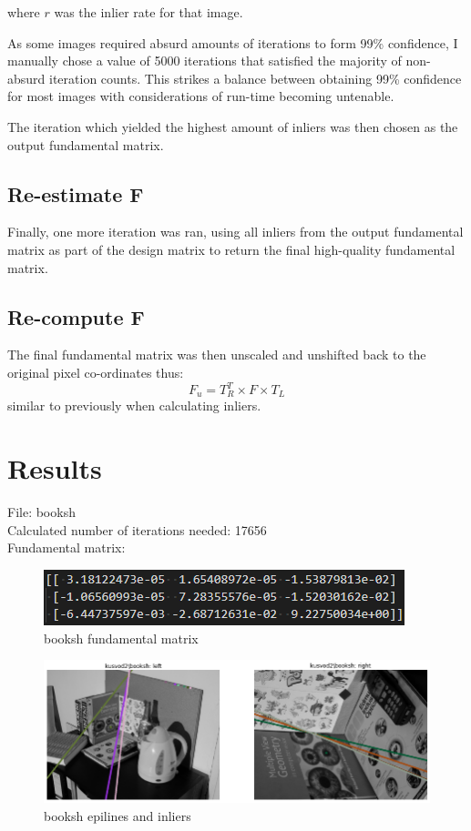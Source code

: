 \documentclass[10pt,a4paper]{article}
\begin{document}
where $r$ was the inlier rate for that image.

As some images required absurd amounts of iterations to form 99\% confidence, I manually chose a value of 5000 iterations that satisfied the majority of non-absurd iteration counts. This strikes a balance between obtaining 99\% confidence for most images with considerations of run-time becoming untenable.

The iteration which yielded the highest amount of inliers was then chosen as the output fundamental matrix.

\subsection*{Re-estimate F}
Finally, one more iteration was ran, using all inliers from the output fundamental matrix as part of the design matrix to return the final high-quality fundamental matrix.

\subsection*{Re-compute F}
The final fundamental matrix was then unscaled and unshifted back to the original pixel co-ordinates thus:
\begin{equation}
	F_u = T_R^T \times F \times T_L
\end{equation}
similar to previously when calculating inliers.

\newpage
\section{Results}
File: booksh\\
Calculated number of iterations needed: 17656\\
Fundamental matrix:
\begin{figure}[H]
	\centering
	\includegraphics[width=0.7\linewidth]{img/bookshf}
	\caption{booksh fundamental matrix}
	\label{fig:bookshf}
\end{figure}
\begin{figure}[H]
	\centering
	\includegraphics[width=0.7\linewidth]{img/booksh}
	\caption{booksh epilines and inliers}
	\label{fig:booksh}
\end{figure}
\end{document}
